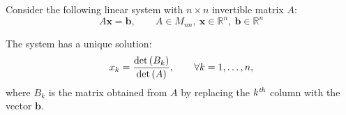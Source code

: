 \begin{multicols}{2}
\begin{CheatsheetEntryFrame}
    \end{CheatsheetEntryFrame}

    \MulticolsBreak

    \begin{CheatsheetEntryFrame}


        Consider the following linear system with $n \times n$ invertible matrix $A$:
        \begin{equation*}
            A \mathbf{x} = \mathbf{b}
            ,\qquad A \in M_{nn},\ \mathbf{x} \in \mathbb{R}^n,\ \mathbf{b} \in \mathbb{R}^n
        \end{equation*}

        The system has a unique solution:
        \begin{equation*}
            x_k = \frac{\det{\parens*{B_k}}}{\det{\parens*{A}}}
            ,\qquad \forall k = 1, \dots, n,
        \end{equation*}
        where $B_k$ is the matrix obtained from $A$ by replacing the $\Nth{k}{th}$ column with the vector $\mathbf{b}$.

        \CheatsheetEntryExtraSeparation


\end{CheatsheetEntryFrame}
\end{multicols}
